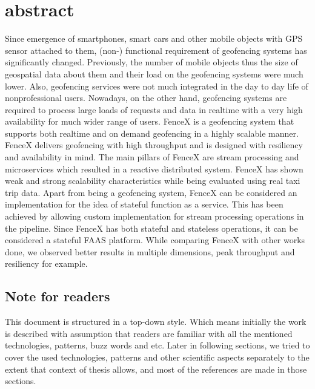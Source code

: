 \documentclass[a4]{report}
\begin{document}
    \section{abstract}
    Since emergence of smartphones, smart cars and other mobile objects with GPS sensor attached to them, (non-)
    functional requirement of geofencing systems has significantly changed.
    Previously, the number of mobile objects thus the size of geospatial data about them and their load on the
    geofencing systems were much lower.
    Also, geofencing services were not much integrated in the day to day life of nonprofessional users.
    Nowadays, on the other hand, geofencing systems are required to process large loads of requests and data in
    realtime with a very high availability for much wider range of users.
    FenceX is a geofencing system that supports both realtime and on demand geofencing in a highly scalable manner.
    FenceX delivers geofencing with high throughput and is designed with resiliency and availability in mind.
    The main pillars of FenceX are stream processing and microservices which resulted in a reactive distributed
    system.
    FenceX has shown weak and strong scalability characteristics while being evaluated using real taxi trip data.
    Apart from being a geofencing system, FenceX can be considered an implementation for the idea of stateful function
    as a service.
    This has been achieved by allowing custom implementation for stream processing operations in the pipeline.
    Since FenceX has both stateful and stateless operations, it can be considered a stateful FAAS platform.
    While comparing FenceX with other works done, we observed better results in multiple dimensions, peak throughput
    and resiliency for example.

    \newpage

    \tableofcontents

    \listoffigures

    \listoftables

    \newpage

    \subsection{Note for readers}
    This document is structured in a top-down style.
    Which means initially the work is described with assumption that readers are familiar with all the mentioned
    technologies, patterns, buzz words and etc.
    Later in following sections, we tried to cover the used technologies, patterns and other scientific aspects
    separately to the extent that context of thesis allows, and most of the references are made in those sections.
\end{document}
